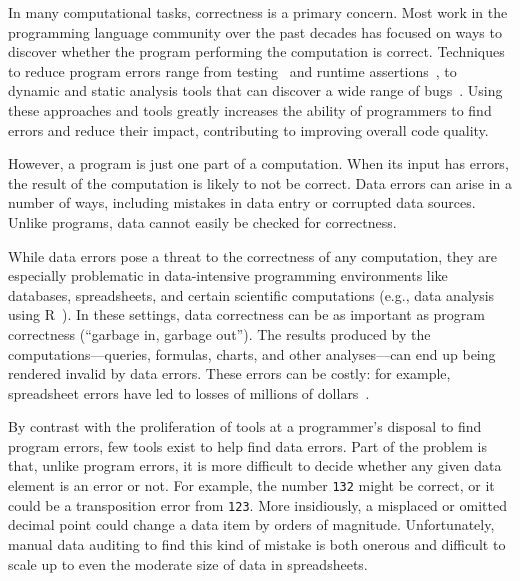 In many computational tasks, correctness is a primary concern. Most
work in the programming language community over the past decades has
focused on ways to discover whether the program performing the computation is
correct. Techniques to reduce program errors range from
testing~\cite{unittesting,fuzztesting} and runtime
assertions~\cite{samanderansthing,others}, to dynamic and static
analysis tools that can discover a wide range of
bugs~\cite{valgrind,dawsonthing,otherpcmemberfoo}. Using these
approaches and tools greatly increases the ability of programmers to
find errors and reduce their impact, contributing to improving overall
code quality.

However, a program is just one part of a computation. When its input
has errors, the result of the computation is likely to not be
correct. Data errors can arise in a number of ways, including mistakes
in data entry or corrupted data sources. Unlike programs, data cannot
easily be checked for correctness.


While data errors pose a threat to the correctness of any computation,
they are especially problematic in data-intensive programming
environments like databases, spreadsheets, and certain scientific
computations (e.g., data analysis using R~\cite{FIXME}). In these settings,
data correctness can be as important as program correctness (``garbage
in, garbage out''). The results produced by the
computations---queries, formulas, charts, and other analyses---can end
up being rendered invalid by data errors. These errors can be costly:
for example, spreadsheet errors have led to losses of millions of
dollars~\cite{FIXME}.




By contrast with the proliferation of tools at a programmer's disposal
to find program errors, few tools exist to help find data errors. Part
of the problem is that, unlike program errors, it is more difficult to
decide whether any given data element is an error or not. For example,
the number \texttt{132} might be correct, or it could be a
transposition error from \texttt{123}. More insidiously, a misplaced
or omitted decimal point could change a data item by orders of
magnitude. Unfortunately, manual data auditing to find this kind of
mistake is both onerous and difficult to scale up to even the moderate
size of data in spreadsheets.


